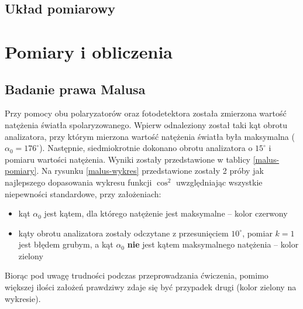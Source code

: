 \documentclass[a4paper]{article}
\begin{document}
\subsection{Układ pomiarowy}



\section{Pomiary i obliczenia}
\subsection{Badanie prawa Malusa}
Przy pomocy obu polaryzatorów oraz fotodetektora została zmierzona wartość natężenia światła spolaryzowanego.
Wpierw odnaleziony został taki kąt obrotu analizatora, przy którym mierzona wartość natężenia światła była maksymalna ($\alpha_0 = 176^\circ$).
Następnie, siedmiokrotnie dokonano obrotu analizatora o $15^\circ$ i pomiaru wartości natężenia.
Wyniki zostały przedstawione w tablicy \ref{malus-pomiary}. 
Na rysunku \ref{malus-wykres} przedstawione zostały 2 próby jak najlepszego dopasowania wykresu funkcji $\cos^2$ uwzględniając wszystkie niepewności standardowe, przy założeniach:
\begin{itemize}
	\item kąt $\alpha_0$ jest kątem, dla którego natężenie jest maksymalne -- kolor czerwony
	\item kąty obrotu analizatora zostały odczytane z przesunięciem $10^\circ$, pomiar $k=1$ jest błędem grubym, a kąt $\alpha_0$ \textbf{nie} jest kątem maksymalnego natężenia -- kolor zielony
\end{itemize}

Biorąc pod uwagę trudności podczas przeprowadzania ćwiczenia, pomimo większej ilości założeń prawdziwy zdaje się być przypadek drugi (kolor zielony na wykresie).
\end{document}
